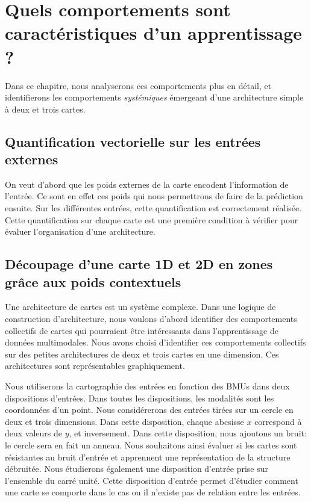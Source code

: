 \documentclass[../main]{subfiles}
\begin{document}
\section{Quels comportements sont caractéristiques d'un apprentissage ?}
Dans ce chapitre, nous analyserons ces comportements plus en détail, et identifierons les comportements \emph{systémiques} émergeant d'une architecture simple à deux et trois cartes.

\subsection{Quantification vectorielle sur les entrées externes}

On veut d'abord que les poids externes de la carte encodent l'information de l'entrée. Ce sont en effet ces poids qui nous permettrons de faire de la prédiction ensuite.
Sur les différentes entrées, cette quantification est correctement réalisée. 
Cette quantification sur chaque carte est une première condition à vérifier pour évaluer l'organisation d'une architecture.

\subsection{Découpage d'une carte 1D et 2D en zones grâce aux poids contextuels}

Une architecture de cartes est un système complexe. 
Dans une logique de construction d'architecture, nous voulons d'abord identifier des comportements collectifs de cartes qui pourraient être intéressants dans l'apprentissage de données multimodales.
Nous avons choisi d'identifier ces comportements collectifs sur des petites architectures de deux et trois cartes en une dimension. Ces architectures sont représentables graphiquement.

Nous utiliserons la cartographie des entrées en fonction des BMUs dans deux dispositions d'entrées.
Dans toutes les dispositions, les modalités sont les coordonnées d'un point.
Nous considérerons des entrées tirées sur un cercle en deux et trois dimensions.
Dans cette disposition, chaque abcsisse $x$ correspond à deux valeurs de $y$, et inversement.
Dans cette disposition, nous ajoutons un bruit: le cercle sera en fait un anneau. Nous souhaitons ainsi évaluer si les cartes sont résistantes au bruit d'entrée et apprennent une représentation de la structure débruitée.
Nous étudierons également une disposition d'entrée prise sur l'ensemble du carré unité. Cette disposition d'entrée permet d'étudier comment une carte se comporte dans le cas ou il n'existe pas de relation entre les entrées.
\end{document}
